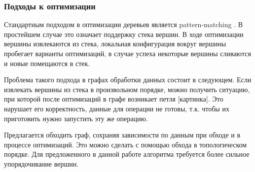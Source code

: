 \subsubsection{Подходы к оптимизации}

Стандартным подходом в оптимизации деревьев является pattern-matching \cite{pattern}. В простейшем случае это означает поддержку стека вершин. В ходе оптимизации вершины извлекаются из стека, локальная конфигурация вокруг вершины пробегает варианты оптимизаций, в случае успеха некоторые вершины сливаются и новые помещаются в стек.

Проблема такого подхода в графах обработки данных состоит в следующем. Если извлекать вершины из стека в произвольном порядке, можно получить ситуацию, при которой после оптимизаций в графе возникает петля [картинка]. Это нарушает его корректность, данные для операции не готовы, т.к. чтобы их приготовить нужно запустить эту же операцию.

Предлагается обходить граф, сохраняя зависимости по данным при обходе и в процессе оптимизаций. Это можно сделать с помощью обхода в топологическом порядке. Для предложенного в данной работе алгоритма требуется более сильное упорядочивание вершин.
